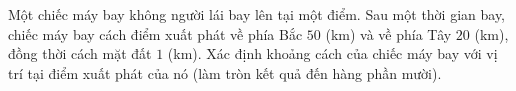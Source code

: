 \begin{ex}%
Một chiếc máy bay không người lái bay lên tại một điểm. Sau một thời gian bay, chiếc máy bay cách điểm xuất phát về phía Bắc $50$ (km) và về phía Tây $20$ (km), đồng thời cách mặt đất $1$ (km). Xác định khoảng cách của chiếc máy bay với vị trí tại điểm xuất phát của nó (làm tròn kết quả đến hàng phần mười).
\end{ex}

